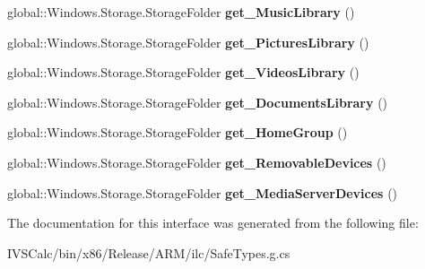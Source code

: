 \begin{DoxyCompactItemize}
\mbox{\label{interface_windows_1_1_storage_1_1_i_known_folders_statics_adcd49c72e55a38fd059c899befb787e3}} 
global\+::\+Windows.\+Storage.\+Storage\+Folder {\bfseries get\+\_\+\+Music\+Library} ()
\item 
\mbox{\label{interface_windows_1_1_storage_1_1_i_known_folders_statics_a9b9ec6853cba04e273a03844185f6a2a}} 
global\+::\+Windows.\+Storage.\+Storage\+Folder {\bfseries get\+\_\+\+Pictures\+Library} ()
\item 
\mbox{\label{interface_windows_1_1_storage_1_1_i_known_folders_statics_a4e094bf4626dc4a6a6cabddd24d74062}} 
global\+::\+Windows.\+Storage.\+Storage\+Folder {\bfseries get\+\_\+\+Videos\+Library} ()
\item 
\mbox{\label{interface_windows_1_1_storage_1_1_i_known_folders_statics_a13665295b51c3f4818fa4670e5c6a652}} 
global\+::\+Windows.\+Storage.\+Storage\+Folder {\bfseries get\+\_\+\+Documents\+Library} ()
\item 
\mbox{\label{interface_windows_1_1_storage_1_1_i_known_folders_statics_a3873e49e2ba9b30c2e9454dc846f4fdd}} 
global\+::\+Windows.\+Storage.\+Storage\+Folder {\bfseries get\+\_\+\+Home\+Group} ()
\item 
\mbox{\label{interface_windows_1_1_storage_1_1_i_known_folders_statics_a82d93b3f375e9c0c78a55429b4bb9b4b}} 
global\+::\+Windows.\+Storage.\+Storage\+Folder {\bfseries get\+\_\+\+Removable\+Devices} ()
\item 
\mbox{\label{interface_windows_1_1_storage_1_1_i_known_folders_statics_af7ac66278db4629c0fb06db6a4c43813}} 
global\+::\+Windows.\+Storage.\+Storage\+Folder {\bfseries get\+\_\+\+Media\+Server\+Devices} ()
\end{DoxyCompactItemize}


The documentation for this interface was generated from the following file\+:\begin{DoxyCompactItemize}
\item 
I\+V\+S\+Calc/bin/x86/\+Release/\+A\+R\+M/ilc/Safe\+Types.\+g.\+cs\end{DoxyCompactItemize}
